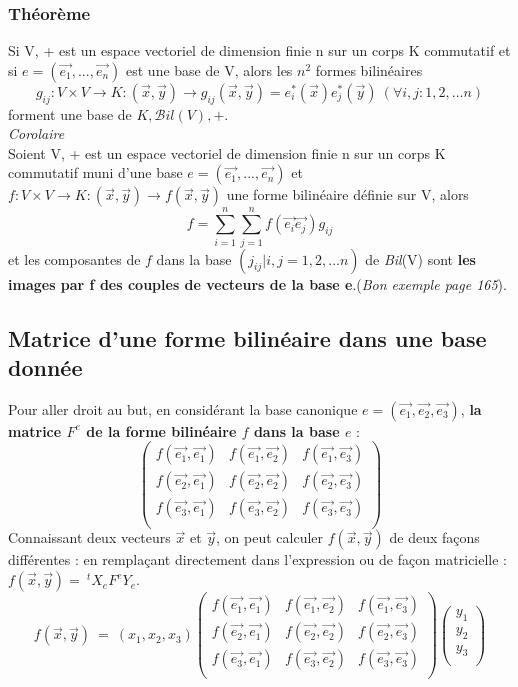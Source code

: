 \documentclass[12pt, a4paper]{article}
\begin{document}
\subsubsection*{Théorème}
Si V, + est un espace vectoriel de dimension finie n sur un corps K commutatif et si $e = (\vec{e_1}, ..., \vec{e_n})$ est une base de V, alors les $n^2$ formes bilinéaires 
$$g_{ij} : V \times V \rightarrow K : (\vec{x}, \vec{y}) \rightarrow g_{ij}(\vec{x}, \vec{y}) = e_i^*(\vec{x})e_j^*(\vec{y})\ (\forall i, j : 1,2,...n)$$
forment une base de $K,\mathcal{B}il(V),+$.\\

\emph{Corolaire}\\
Soient V, + est un espace vectoriel de dimension finie n sur un corps K commutatif muni d'une base $e = (\vec{e_1}, ..., \vec{e_n})$ et $f : V \times V \rightarrow K : (\vec{x}, \vec{y}) \rightarrow f(\vec{x}, \vec{y})$ une forme bilinéaire définie sur V, alors
$$f = \sum_{i=1}^n\sum_{j=1}^n f(\vec{e_i}\vec{e_j})g_{ij}$$
et les composantes de $f$ dans la base $(j_{ij} | i,j= 1,2,...n)$ de \textit{Bil}(V) sont \textbf{les images par f des couples de vecteurs de la base e}.(\textit{Bon exemple page 165}).

\subsection{Matrice d'une forme bilinéaire dans une base donnée}
Pour aller droit au but, en considérant la base canonique $e = (\vec{e_1}, \vec{e_2}, \vec{e_3})$, \textbf{la matrice $F^e$ de la forme bilinéaire $f$ dans la base $e$} :
$$\begin{pmatrix}
f(\vec{e_1}, \vec{e_1}) & f(\vec{e_1}, \vec{e_2}) & f(\vec{e_1}, \vec{e_3})\\
f(\vec{e_2}, \vec{e_1}) & f(\vec{e_2}, \vec{e_2}) & f(\vec{e_2}, \vec{e_3})\\
f(\vec{e_3}, \vec{e_1}) & f(\vec{e_3}, \vec{e_2}) & f(\vec{e_3}, \vec{e_3})\\
\end{pmatrix}$$
Connaissant deux vecteurs $\vec{x}$ et $\vec{y}$, on peut calculer $f(\vec{x}, \vec{y})$ de deux façons différentes : en remplaçant directement dans l'expression ou de façon matricielle :$f(\vec{x}, \vec{y}) =\ ^tX_e F^e Y_e$.
$$f(\vec{x}, \vec{y})\ =\ \left(x_1, x_2, x_3\right)\begin{pmatrix}
f(\vec{e_1}, \vec{e_1}) & f(\vec{e_1}, \vec{e_2}) & f(\vec{e_1}, \vec{e_3})\\
f(\vec{e_2}, \vec{e_1}) & f(\vec{e_2}, \vec{e_2}) & f(\vec{e_2}, \vec{e_3})\\
f(\vec{e_3}, \vec{e_1}) & f(\vec{e_3}, \vec{e_2}) & f(\vec{e_3}, \vec{e_3})\\
\end{pmatrix}\begin{pmatrix}
y_1\\
y_2\\
y_3\\
\end{pmatrix}$$
\end{document}
